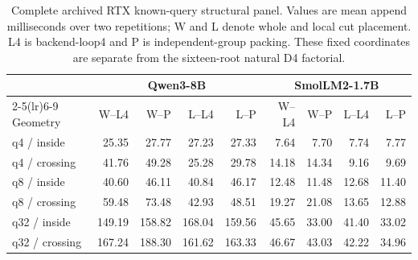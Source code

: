\begin{table}[t]
\centering\footnotesize\tighttable
\caption{Complete archived RTX known-query structural panel. Values are mean append milliseconds over two repetitions; W and L denote whole and local cut placement. L4 is backend-loop4 and P is independent-group packing. These fixed coordinates are separate from the sixteen-root natural D4 factorial.}
\label{tab:all-rtx-cells}
\begin{tabular}{@{}lrrrrrrrr@{}}\toprule
 & \multicolumn{4}{c}{Qwen3-8B} & \multicolumn{4}{c}{SmolLM2-1.7B}\\
\cmidrule(lr){2-5}\cmidrule(lr){6-9}
Geometry & W--L4 & W--P & L--L4 & L--P & W--L4 & W--P & L--L4 & L--P\\\midrule
q4 / inside & 25.35 & 27.77 & 27.23 & 27.33 & 7.64 & 7.70 & 7.74 & 7.77 \\
q4 / crossing & 41.76 & 49.28 & 25.28 & 29.78 & 14.18 & 14.34 & 9.16 & 9.69 \\
q8 / inside & 40.60 & 46.11 & 40.84 & 46.17 & 12.48 & 11.48 & 12.68 & 11.40 \\
q8 / crossing & 59.48 & 73.48 & 42.93 & 48.51 & 19.27 & 21.08 & 13.65 & 12.88 \\
q32 / inside & 149.19 & 158.82 & 168.04 & 159.56 & 45.65 & 33.00 & 41.40 & 33.02 \\
q32 / crossing & 167.24 & 188.30 & 161.62 & 163.33 & 46.67 & 43.03 & 42.22 & 34.96 \\
\bottomrule\end{tabular}
\end{table}

